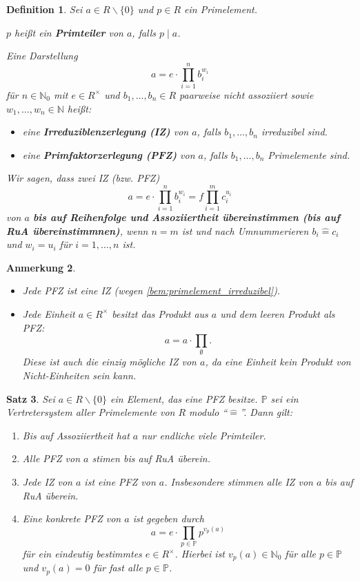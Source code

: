 \documentclass[a4paper, twoside, 11pt, ngerman]{report}
\newcommand{\NN}{\mathds N}
\newcommand{\PP}{\mathds P}
\renewcommand{\setminus}{\smallsetminus}
\newcommand{\assoc}{\mathrel{\widehat{=}}}
\theoremstyle{definistyle}
\newtheorem{satz}{Satz}[section]
\newtheorem{defini}[satz]{Definition}
\newtheorem{anm}[satz]{Anmerkung}
\theoremstyle{remark}
\newcommand{\defn}[1]{\textit{\bfseries #1}}
\begin{document}
\begin{defini}\label{def:primteiler_zerlegung}
Sei $a \in R \setminus \{0\}$ und $p \in R$ ein Primelement. 

$p$ heißt ein \defn{Primteiler} von $a$, falls $p \mid a$. 

Eine Darstellung \[a = e \cdot \prod_{i=1}^n b_i^{w_i}\] für $n \in \NN_0$ mit $e \in R^\times$ und $b_1, \dots, b_n \in R$ paarweise nicht assoziiert sowie $w_1, \dots, w_n \in \NN$ heißt:
\begin{itemize}
    \item eine \defn{Irreduziblenzerlegung (IZ)} von $a$, falls $b_1, \dots, b_n$ irreduzibel sind.
    \item eine \defn{Primfaktorzerlegung (PFZ)} von $a$, falls $b_1, \dots, b_n$ Primelemente sind.
\end{itemize}
Wir sagen, dass zwei IZ (bzw. PFZ)
\[
a=e \cdot \prod_{i=1}^n b_i^{w_i}=f\prod_{i=1}^m c_i^{u_i}
\]
von $a$ \textbf{bis auf Reihenfolge und Assoziiertheit übereinstimmen (bis auf RuA übereinstimmnen)}, wenn 
$n=m$ ist und nach Umnummerieren $b_i\assoc c_i$ und $w_i=u_i$ für $i=1,\ldots,n$ ist.
\end{defini}

\begin{anm}\label{anm:primfaktorzerlegung_ist_irreduzibilitaetszerlegung}
\begin{itemize}
\item Jede PFZ ist eine IZ (wegen \ref{bem:primelement_irreduzibel}).
\item Jede Einheit $a \in R^\times$ besitzt das Produkt aus $a$ und dem leeren Produkt als PFZ:
\[
a = a \cdot \prod_{\emptyset}.
\]
Diese ist auch die einzig mögliche IZ von $a$, da eine Einheit kein Produkt von Nicht-Einheiten sein kann.
\end{itemize}
\end{anm}



\begin{satz}\label{satz:primfaktorzerlegung}
Sei $a \in R \setminus \{0\}$ ein Element, das eine PFZ besitze. $\PP$ sei ein Vertretersystem aller Primelemente von $R$ modulo "`$\assoc$"'. Dann gilt:
\begin{enumerate}[label=(\alph*)]
    \item Bis auf Assoziiertheit hat $a$ nur endliche viele Primteiler. 
    \item Alle PFZ von $a$ stimen bis auf RuA überein.
    \item Jede IZ von $a$ ist eine PFZ von $a$. Insbesondere stimmen alle IZ von $a$ bis auf RuA überein.
    \item Eine konkrete PFZ von $a$ ist gegeben durch
    \[
    a = e \cdot \prod_{p \in \PP} p^{v_p(a)}
    \]
    für ein eindeutig bestimmtes $e \in R^\times$. Hierbei ist $v_p(a)\in\NN_0$ für alle
    $p\in\PP$ und $v_p(a)=0$ für fast alle $p\in\PP$.
\end{enumerate}
\end{satz}
\end{document}
